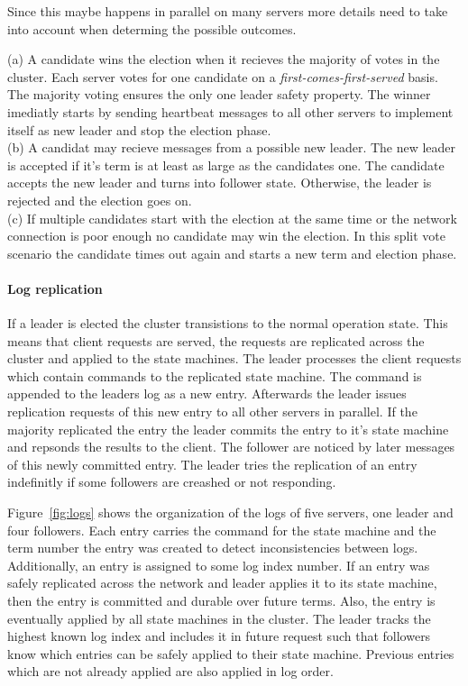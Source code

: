 Since this maybe happens in parallel on many servers more details
need to take into account when determing the possible outcomes.

(a) A candidate wins the election when it recieves the majority of
votes in the cluster. Each server votes for one candidate on a
\textit{first-comes-first-served} basis. The majority voting ensures
the only one leader safety property. The winner imediatly starts
by sending heartbeat messages to all other servers to implement itself
as new leader and stop the election phase.~\cite{ongaro2014consensus}\\
(b) A candidat may recieve messages from a possible new leader.
The new leader is accepted if it's term is at least as large as
the candidates one. The candidate accepts the new leader and turns
into follower state. Otherwise, the leader is rejected and the election
goes on.~\cite{ongaro2014consensus}\\
(c) If multiple candidates start with the election at the same
time or the network connection is poor enough no candidate may win
the election. In this split vote scenario the candidate times out again
and starts a new term and election phase.\cite{ongaro2014consensus}

\paragraph{Log replication}
If a leader is elected the cluster transistions to the normal operation
state. This means that client requests are served, the requests are
replicated across the cluster and applied to the state machines.
The leader processes the client requests which contain commands to
the replicated state machine. The command is appended to the leaders
log as a new entry. Afterwards the leader issues replication requests
of this new entry to all other servers in parallel. If the majority
replicated the entry the leader commits the entry to it's state machine
and repsonds the results to the client. The follower are noticed by
later messages of this newly committed entry. The leader
tries the replication of an entry indefinitly if some followers
are creashed or not responding.~\cite{ongaro2014search}

Figure~\ref{fig:logs} shows the organization of the logs of five servers,
one leader and four followers. Each entry carries the command for the state
machine and the term number the entry was created to detect inconsistencies
between logs. Additionally, an entry is assigned to some log index number.
If an entry was safely replicated across the network and leader applies
it to its state machine, then the entry is committed and durable over
future terms. Also, the entry is eventually applied by all state machines
in the cluster. The leader tracks the highest known log index and includes
it in future request such that followers know which entries can be
safely applied to their state machine. Previous entries which are
not already applied are also applied in log order.~\cite{ongaro2014consensus}


